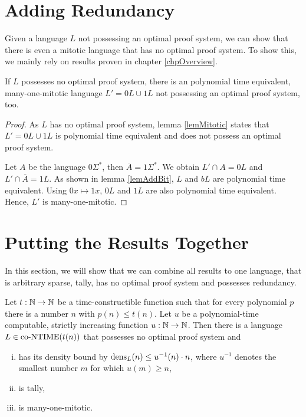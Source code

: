   \section{Adding Redundancy}

  Given a language \(L\) not possessing an optimal proof system, we can show that there is even a mitotic language that has no optimal proof system. To show this, we mainly rely on results proven in chapter \ref{chpOverview}.

  \begin{theorem} \label{thmMitotic}
    If \(L\) possesses no optimal proof system, there is an polynomial time equivalent, many-one-mitotic language \(L' = 0L \cup 1L\) not possessing an optimal proof system, too.
  \end{theorem}

  \begin{proof}
    As \(L\) has no optimal proof system, lemma \ref{lemMitotic} states that \(L' = 0L \cup 1L\) is polynomial time equivalent and does not possess an optimal proof system.

    Let \(A\) be the language \(0\Sigma^*\), then \(\overline{A} = 1\Sigma^*\). We obtain \(L' \cap A = 0L\) and \(L' \cap \overline{A} = 1L\). As shown in lemma \ref{lemAddBit}, \(L\) and \(bL\) are polynomial time equivalent. Using \(0x \mapsto 1x\), \(0L\) and \(1L\) are also polynomial time equivalent. Hence, \(L'\) is many-one-mitotic.
  \end{proof}
  
  
  \section{Putting the Results Together}
  
  In this section, we will show that we can combine all results to one language, that is arbitrary sparse, tally, has no optimal proof system and possesses redundancy.
  
  \begin{corollary}
    Let \(t:\mathbb{N}\to\mathbb{N}\) be a time-constructible function such that for every polynomial \(p\) there is a number \(n\) with \(p(n) \leq t(n)\). Let \(u\) be a polynomial-time computable, strictly increasing function \(u:\mathbb{N}\to\mathbb{N}\). Then there is a language \(L \in \text{co-NTIME}(t(n))\) that possesses no optimal proof system and 
    \begin{enumerate}[(i)]
     \item has its density bound by \(\operatorname{dens}_L(n) \leq u^{-1}(n) \cdot n\), where \(u^{-1}\) denotes the smallest number \(m\) for which \(u(m) \geq n\),
     \item is tally,
     \item is many-one-mitotic.
    \end{enumerate}
  \end{corollary}
  
